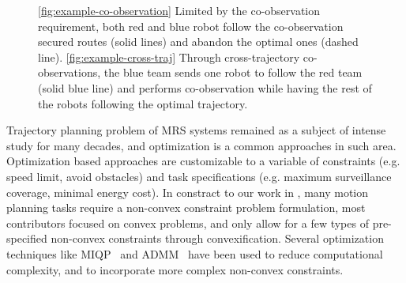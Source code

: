 \documentclass[10pt,twocolumn,twoside]{IEEEtran}
\begin{document}
\begin{figure}
	\centering
    
    \caption{\ref{fig:example-co-observation} Limited by the co-observation requirement, both red and blue robot follow the co-observation secured routes (solid lines) and abandon the optimal ones (dashed line). \ref{fig:example-cross-traj} Through cross-trajectory co-observations, the blue team sends one robot to follow the red team (solid blue line) and performs co-observation while having the rest of the robots following the optimal trajectory.}\label{fig:cross-traj-comparison-set}
\end{figure}

\noindent{} Trajectory planning problem of MRS systems remained as a subject of intense study for many decades, and optimization is a common approaches in such area. Optimization based approaches are customizable to a variable of constraints (e.g. speed limit, avoid obstacles) and task specifications (e.g. maximum surveillance coverage, minimal energy cost). In constract to our work in , many motion planning tasks require a non-convex constraint problem formulation, most contributors focused on convex problems, and only allow for a few types of pre-specified non-convex constraints through convexification\cite{liu2014solving}\cite{VanParys2016}\cite{Schulman2014}. Several optimization techniques like MIQP~\cite{mellinger2012mixed} and ADMM~\cite{bento2013message} have been used to reduce computational complexity, and to incorporate more complex non-convex constraints.
\end{document}
